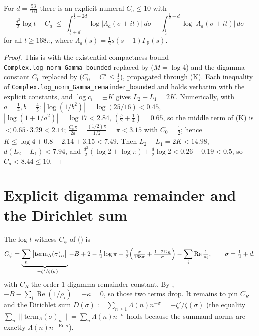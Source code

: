\begin{lemma}
\label{lem:le_arch_explicit}
\leanok
{}
For $d=\tfrac{53}{100}$ there is an explicit numeral $C_a\le 10$ with
\[
  \tfrac{d^2}2\log t-C_a\ \le\
  \int_{\frac12+d}^{\frac12+2d}\log|\Lambda_a(\sigma+it)|\,d\sigma
   -\int_{\frac12}^{\frac12+d}\log|\Lambda_a(\sigma+it)|\,d\sigma
\]
for all $t\ge168\pi$, where $\Lambda_a(s)=\tfrac12 s(s-1)\Gamma_{\mathbb R}(s)$.
\end{lemma}

\begin{proof}
\leanok
This is  with the existential compactness bound
\texttt{Complex.log\_norm\_Gamma\_bounded} replaced by 
($M=\log4$) and the digamma constant $C_0$ replaced by \Cref{lem:le_digamma_const}
($C_0=C^{\star}\le\tfrac12$), propagated through (K). Each inequality of
\texttt{Complex.log\_norm\_Gamma\_remainder\_bounded} and
 holds verbatim with the explicit constants,
and $\log c_i=\pm K$ gives $L_2-L_1=2K$. Numerically, with $a=\tfrac14,b=\tfrac45$:
$|\log(1/b^2)|=\log(25/16)<0.45$, $|\log(1+1/a^2)|=\log17<2.84$,
$(\tfrac b2+\tfrac14)=0.65$, so the middle term of (K) is $<0.65\cdot3.29<2.14$;
$\tfrac{C_0\pi}{2a}=\tfrac{(1/2)\pi}{1/2}=\pi<3.15$ with $C_0=\tfrac12$; hence
$K\le\log4+0.8+2.14+3.15<7.49$. Then $L_2-L_1=2K<14.98$, $d(L_2-L_1)<7.94$, and
$\tfrac{d^2}2(\log2+\log\pi)+\tfrac d2\log2<0.26+0.19<0.5$, so $C_a<8.44\le 10$.
\end{proof}

\section{Explicit digamma remainder and the Dirichlet sum}
\label{sec:le_dirichlet}

The log-$t$ witness $C_\psi$ of 
() is
\[
  C_\psi=\underbrace{\sum_n\bigl\|\mathrm{term}_\Lambda(\sigma)_n\bigr\|}_{=\;-\zeta'/\zeta(\sigma)}
        -B+2-\tfrac12\log\pi
        +\tfrac12\Bigl(\tfrac{\sigma}{168\pi}+\tfrac{1+2C_R}{\sigma}\Bigr)
        -\sum_i\operatorname{Re}\tfrac1{\rho_i},
  \qquad\sigma=\tfrac12+d,
\]
with $C_R$ the order-$1$ digamma-remainder constant. By ,
$-B-\sum_i\operatorname{Re}(1/\rho_i)=-\kappa=0$, so those two terms drop. It remains to
pin $C_R$ and the Dirichlet sum $D(\sigma):=\sum_{n\ge1}\Lambda(n)n^{-\sigma}=-\zeta'/\zeta(\sigma)$
(the equality $\sum_n\|\mathrm{term}_\Lambda(\sigma)_n\|=\sum_n\Lambda(n)n^{-\sigma}$ holds
because the summand norms are exactly $\Lambda(n)n^{-\operatorname{Re}\sigma}$).

